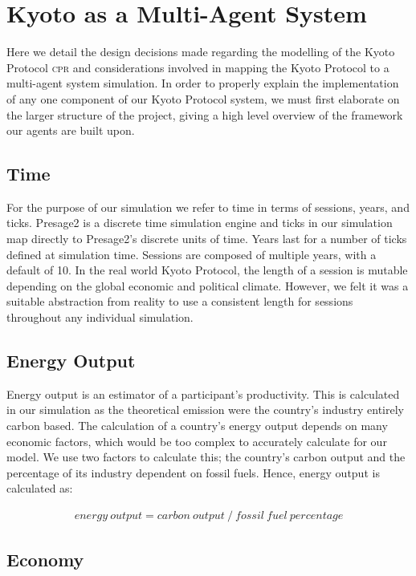 \section{Kyoto as a Multi-Agent System}

Here we detail the design decisions made regarding the modelling of the Kyoto Protocol \textsc{cpr} and considerations involved in mapping the Kyoto Protocol to a multi-agent system simulation. In order to properly explain the implementation of any one component of our Kyoto Protocol system, we must first elaborate on the larger structure of the project, giving a high level overview of the framework our agents are built upon.

\subsection{Time}

For the purpose of our simulation we refer to time in terms of sessions, years, and ticks. Presage2 is a discrete time simulation engine and ticks in our simulation map directly to Presage2's discrete units of time. Years last for a number of ticks defined at simulation time. Sessions are composed of multiple years, with a default of 10. In the real world Kyoto Protocol, the length of a session is mutable depending on the global economic and political climate. However, we felt it was a suitable abstraction from reality to use a consistent length for sessions throughout any individual simulation.

\subsection{Energy Output}

Energy output is an estimator of a participant's productivity. This is calculated in our simulation as the theoretical \CO emission were the country's industry entirely carbon based. The calculation of a country's energy output depends on many economic factors, which would be too complex to accurately calculate for our model. We use two factors to calculate this; the country's carbon output and the percentage of its industry dependent on fossil fuels. Hence, energy output is calculated as: 

\begin{align*}
energy~output = carbon~output~/~fossil~fuel~percentage
\end{align*}

\subsection{Economy}

